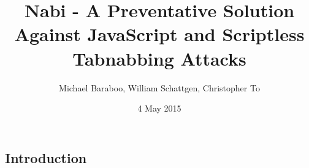 \documentclass[12pt]{article}
\title{Nabi - A Preventative Solution Against JavaScript and Scriptless Tabnabbing Attacks}
\author{Michael Baraboo, William Schattgen, Christopher To}
\date{4 May 2015}
\begin{document}
\maketitle

\thispagestyle{empty}

\begin{abstract}
  
\end{abstract}

\begin{doublespace}

\section{Introduction}
\begin{comment}
The use of the internet has become an almost unavoidable part of life. As the internet becomes more involved with everyday life, users put more and more of their personal information online. Phishing is the process of stealing, gaining access to, or recording personal accounts or information. Phishing attacks try to convince the target to give up personal information such as passwords, account names, credit card numbers, addresses, and other valuable information or credentials. Phishing has many mediums such as email, phone, websites, and even mail. This information can be used in a variety of destructive ways from the thievery of personal assets to identity theft. Tabnabbing is a specific phishing technique that relies on the user’s trust of websites they have already viewed and considered safe. Some users often leave many tabs open to return to interesting websites at a later time and this behavior makes those users the perfect target for this type of attack. When the user is not has left a tab a malicious webesite can detect that the user is not currently viewing that tab and change the content of that page. This is done using JavaScript or by using the meta tag with a timer to redirect the page at a time when the user is most likely not viewing it. An example of one such change is making the page apear to be the gmail login page in the hopes that the user will atempt to login giving the malicious site the username and password for the unsuspecting user. Phishing attacks are becoming more common as web use increases, and as users become more aware of phishing attacks, phishing techniques adapt to continue to be effective. Tabnabbing is one such new technique that has emerged recently and is effective even against users that have been trained to only give sensitive information to trusted websites.
\end{comment}


\end{doublespace}
\end{document}
